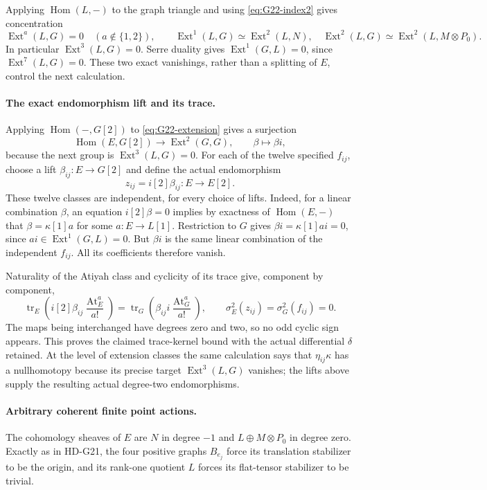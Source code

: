 Applying \(\operatorname{Hom}(L,-)\) to the graph triangle and
using \eqref{eq:G22-index2} gives concentration
\[
 \operatorname{Ext}^a(L,G)=0\quad(a\notin\{1,2\}),
 \qquad
 \operatorname{Ext}^1(L,G)\simeq\operatorname{Ext}^2(L,N),
 \quad
 \operatorname{Ext}^2(L,G)\simeq
                         \operatorname{Ext}^2(L,M\otimes P_0).
\]
In particular \(\operatorname{Ext}^3(L,G)=0\).
Serre duality gives \(\operatorname{Ext}^1(G,L)=0\), since
\(\operatorname{Ext}^7(L,G)=0\). These two exact vanishings,
rather than a splitting of \(E\), control the next calculation.

\paragraph{The exact endomorphism lift and its trace.}
Applying \(\operatorname{Hom}(-,G[2])\) to
\eqref{eq:G22-extension} gives a surjection
\[
 \operatorname{Hom}(E,G[2])\longrightarrow
       \operatorname{Ext}^2(G,G),\qquad \beta\longmapsto\beta i,
\]
because the next group is \(\operatorname{Ext}^3(L,G)=0\).
For each of the twelve specified \(f_{ij}\), choose a lift
\(\beta_{ij}:E\to G[2]\) and define the actual endomorphism
\[
                         z_{ij}=i[2]\beta_{ij}:E\longrightarrow E[2].
\]
These twelve classes are independent, for every choice of lifts.
Indeed, for a linear combination \(\beta\), an equation
\(i[2]\beta=0\) implies by exactness of
\(\operatorname{Hom}(E,-)\) that
\(\beta=\kappa[1]a\) for some \(a:E\to L[1]\).
Restriction to \(G\) gives
\(\beta i=\kappa[1]ai=0\), since
\(ai\in\operatorname{Ext}^1(G,L)=0\).
But \(\beta i\) is the same linear combination of the independent
\(f_{ij}\). All its coefficients therefore vanish.

Naturality of the Atiyah class and cyclicity of its trace give,
component by component,
\[
 \operatorname{tr}_E\!\left(i[2]\beta_{ij}
                 \frac{\operatorname{At}_E^a}{a!}\right)
  =\operatorname{tr}_G\!\left(\beta_{ij}i
                 \frac{\operatorname{At}_G^a}{a!}\right),
 \qquad \sigma_E^2(z_{ij})=\sigma_G^2(f_{ij})=0.
\]
The maps being interchanged have degrees zero and two, so no odd
cyclic sign appears. This proves the claimed trace-kernel bound with
the actual differential \(\delta\) retained. At the level of
extension classes the same calculation says that
\(\eta_{ij}\kappa\) has a nullhomotopy because its precise target
\(\operatorname{Ext}^3(L,G)\) vanishes; the lifts above supply
the resulting actual degree-two endomorphisms.

\paragraph{Arbitrary coherent finite point actions.}
The cohomology sheaves of \(E\) are \(N\) in degree \(-1\)
and \(L\oplus M\otimes P_0\) in degree zero. Exactly as in
HD-G21, the four positive graphs \(B_{e_j}\) force its translation
stabilizer to be the origin, and its rank-one quotient \(L\) forces
its flat-tensor stabilizer to be trivial.

